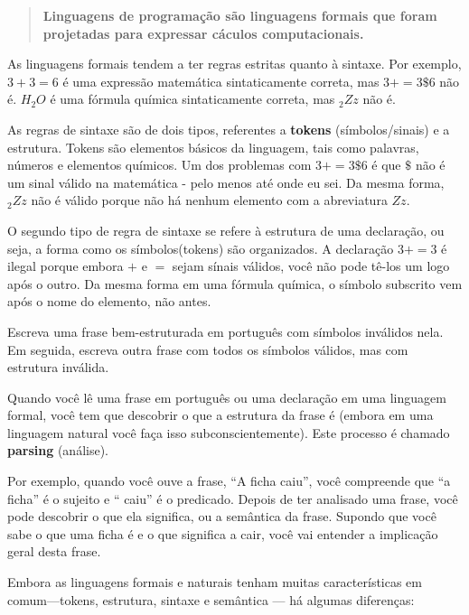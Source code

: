 \documentclass[10pt]{book}
\begin{document}
\begin{quote}
{\bf Linguagens de programação são linguagens formais que foram
projetadas para expressar cáculos computacionais.}
\end{quote}

As linguagens formais tendem a ter regras estritas quanto à sintaxe. Por exemplo,
$3 + 3 = 6$ é uma expressão matemática sintaticamente correta, mas 
$3 + = 3 \mbox{\$} 6$ não é.
$H_2O$ é uma fórmula química
sintaticamente correta, mas $_2Zz$ não é.

As regras de sintaxe são de dois tipos, referentes a {\bf tokens} (símbolos/sinais) e
a estrutura. Tokens são elementos básicos da linguagem, tais como
palavras, números e elementos químicos. Um dos problemas com
$3 + = 3 \mbox{\$} 6$ é que \( \$ \) não é um sinal válido na matemática -
pelo menos até onde eu sei. Da mesma forma, $_2Zz$ não é válido porque
não há nenhum elemento com a abreviatura $Zz$.

O segundo tipo de regra de sintaxe se refere à estrutura de uma
declaração, ou seja, a forma como os símbolos(tokens) são organizados. A declaração
$3 + = 3$ é ilegal porque embora $+$ e $=$ sejam
sínais válidos, você não pode tê-los um logo após o outro. Da mesma forma
em uma fórmula química, o símbolo subscrito vem após o nome do elemento, não
antes.

\begin{exercise}

Escreva uma frase bem-estruturada
em português com símbolos inválidos nela. Em seguida, escreva outra frase
com todos os símbolos válidos, mas com estrutura inválida.

\end{exercise}

Quando você lê uma frase em português ou uma declaração em uma linguagem
formal, você tem que descobrir o que a estrutura da frase é
(embora em uma linguagem natural você faça isso subconscientemente). Este
processo é chamado {\bf parsing} (análise).

Por exemplo, quando você ouve a frase, ``A ficha caiu'', você
compreende que ``a ficha'' é o sujeito e `` caiu'' é o
predicado. Depois de ter analisado uma frase, você pode descobrir o que ela
significa, ou a semântica da frase. Supondo que você sabe
o que uma ficha é e o que significa a cair, você vai entender a
implicação geral desta frase.

Embora as linguagens formais e naturais tenham muitas características em
comum---tokens, estrutura, sintaxe e semântica --- há algumas
diferenças:
\end{document}
